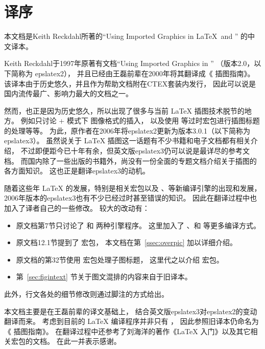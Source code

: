 
\section*{译序}

本文档是Keith Reckdahl所著的``Using Imported Graphics in \LaTeX\ and \pdfLaTeX'' 的中文译本。

Keith Reckdahl于1997年原著有文档``Using Imported Graphics in \LaTeXe{}''
（版本2.0，以下简称为 epslatex2），
并且已经由王磊前辈在2000年将其翻译成《\LaTeXe{} 插图指南》。
该译本由于历史悠久，并且作为帮助文档附在CTEX套装内发行，
因此可以说是国内流传最广、影响力最大的文档之一。

然而，也正是因为历史悠久，所以出现了很多与当前 \LaTeX{} 插图技术脱节的地方。
例如只讨论 + 模式下  图像格式的插入，
以及使用  等过时宏包进行插图标题的处理等等。
为此，原作者在2006年将epslatex2更新为版本3.0.1（以下简称为 epslatex3）。
虽然说关于 \LaTeX{} 插图这一话题有不少书籍和电子文档都有相关介绍，
不过即便距今已十年有余，但英文版epslatex3仍可以说是最详尽的参考文档。
而国内除了一些出版的书籍外，尚没有一份全面的专题文档介绍关于插图的各方面知识。
这也正是翻译epslatex3的动机。

随着这些年 \LaTeX{} 的发展，特别是相关宏包以及 \XeTeX{}、\LuaTeX 等新编译引擎的出现和发展，
2006年版本的epslatex3也有不少已经过时甚至错误的知识。
因此在翻译过程中也加入了译者自己的一些修改。
较大的改动有：
\begin{itemize}
	\item 原文档第7节只讨论了  和  两种引擎程序。
	这里加入了 、和 等更多编译方式。
	\item 原文档12.1节提到了  宏包，
	本文档在第~\ref{ssec:overpic} 加以详细介绍。
	\item 原文档的第32节使用  宏包处理子图标题，
	这里代之以介绍  宏包。
	\item 第~\ref{sec:figintext} 节关于图文混排的内容来自于旧译本。
\end{itemize}
此外，行文各处的细节修改则通过脚注的方式给出。

本文档主要是在王磊前辈的译文基础上，
结合英文版epslatex3对epslatex2的变动翻译而来。
考虑到目前的 \LaTeX{} 编译程序并非只有 \pdfTeX{}，
因此参照旧译本仍命名为《\LaTeXe{} 插图指南》。
在翻译过程中还参考了刘海洋的著作《\LaTeX{} 入门》以及其它相关宏包的文档。
在此一并表示感谢。

\newpage

